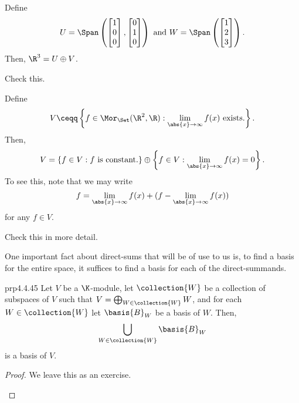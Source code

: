 \begin{exm}{}{}
	Define
	\begin{equation}
	U=\Span \left( \begin{bmatrix}1 \\ 0 \\ 0\end{bmatrix},\begin{bmatrix}0 \\ 1 \\ 0\end{bmatrix}\right) \text{ and }W=\Span \left( \begin{bmatrix}1 \\ 2 \\ 3\end{bmatrix}\right) .
	\end{equation}
	Then, $\R ^3=U\oplus V$.
	\begin{exr}[breakable=false]{}{}
		Check this.
	\end{exr}
\end{exm}
\begin{exm}{}{}
	Define
	\begin{equation}
	V\ceqq \left\{ f\in \Mor _{\Set}(\R ^2,\R ):\lim _{\abs{x}\to \infty}f(x)\text{ exists.}\right\} .
	\end{equation}
	Then,
	\begin{equation}
	V=\left\{ f\in V:f\text{ is constant.}\right\} \oplus \left\{ f\in V:\lim _{\abs{x}\to \infty}f(x)=0\right\} .
	\end{equation}
	To see this, note that we may write
	\begin{equation}
	f=\lim _{\abs{x}\to \infty}f(x)+(f-\lim _{\abs{x}\to \infty}f(x))
	\end{equation}
	for any $f\in V$.
	\begin{exr}[breakable=false]{}{}
		Check this in more detail.
	\end{exr}
\end{exm}

One important fact about direct-sums that will be of use to us is, to find a basis for the entire space, it suffices to find a basis for each of the direct-summands.
\begin{prp}{}{prp4.4.45}
	Let $V$ be a $\K$-module, let $\collection{W}$ be a collection of subspaces of $V$ such that $V=\bigoplus _{W\in \collection{W}}W$, and for each $W\in \collection{W}$ let $\basis{B}_W$ be a basis of $W$.  Then,
	\begin{equation}
		\bigcup _{W\in \collection{W}}\basis{B}_W
	\end{equation}
	is a basis of $V$.
	\begin{proof}
		We leave this as an exercise.
		\begin{exr}[breakable=false]{}{}
			
		\end{exr}
	\end{proof}
\end{prp}

